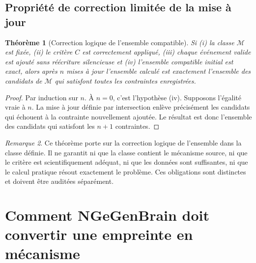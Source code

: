 \documentclass[11pt,oneside]{book}
\newtheorem{theoreme}{Théorème}[chapter]
\theoremstyle{definition}
\theoremstyle{remark}
\newtheorem{remarque}[theoreme]{Remarque}
\newcommand{\Mcal}{\mathcal M}
\newcommand{\1}{\mathbf 1}
\begin{document}
\section{Propriété de correction limitée de la mise à jour}
\begin{theoreme}[Correction logique de l'ensemble compatible]
Si (i) la classe $\Mcal$ est fixée, (ii) le critère $C$ est correctement appliqué, (iii) chaque événement valide est ajouté sans réécriture silencieuse et (iv) l'ensemble compatible initial est exact, alors après $n$ mises à jour l'ensemble calculé est exactement l'ensemble des candidats de $\Mcal$ qui satisfont toutes les contraintes enregistrées.
\end{theoreme}
\begin{proof}
Par induction sur $n$. À $n=0$, c'est l'hypothèse (iv). Supposons l'égalité vraie à $n$. La mise à jour définie par intersection enlève précisément les candidats qui échouent à la contrainte nouvellement ajoutée. Le résultat est donc l'ensemble des candidats qui satisfont les $n+1$ contraintes.\end{proof}

\begin{remarque}
Ce théorème porte sur la correction logique de l'ensemble dans la classe définie. Il ne garantit ni que la classe contient le mécanisme source, ni que le critère est scientifiquement adéquat, ni que les données sont suffisantes, ni que le calcul pratique résout exactement le problème. Ces obligations sont distinctes et doivent être auditées séparément.
\end{remarque}

\chapter{Comment NGeGenBrain doit convertir une empreinte en mécanisme}
\end{document}
